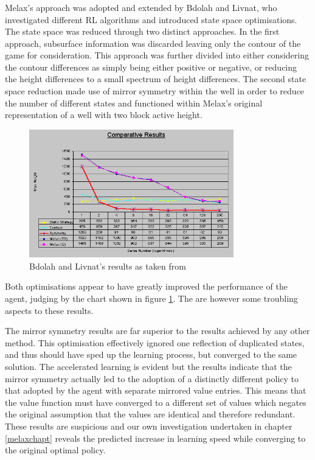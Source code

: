 \documentclass{rucsthesis}
\begin{document}
\subsubsection{\cite{yaeltetris}}

Melax's approach was adopted and extended by Bdolah and Livnat, who investigated different RL algorithms and introduced state space optimisations. The state space was reduced through two distinct approaches. In the first approach, subsurface information was discarded leaving only the contour of the game for consideration. This approach was further divided into either considering the contour differences as simply being either positive or negative, or reducing the height differences to a small spectrum of height differences. The second state space reduction made use of mirror symmetry within the well in order to reduce the number of different states and functioned within Melax's original representation of a well with two block active height.

\begin{figure}[h]
\centering
\includegraphics[width=3.5in]{results.png}
\caption{Bdolah and Livnat's results as taken from \cite{yaeltetris}}
\label{fig:yaelres}
\end{figure}

Both optimisations appear to have greatly improved the performance of the agent, judging by the chart shown in figure \ref{fig:yaelres}. The are however some troubling aspects to these results.

The mirror symmetry results are far superior to the results achieved by any other method. This optimisation effectively ignored one reflection of duplicated states, and thus should have sped up the learning process, but converged to the same solution. The accelerated learning is evident but the results indicate that the mirror symmetry actually led to the adoption of a distinctly different policy to that adopted by the agent with separate mirrored value entries. This means that the value function must have converged to a different set of values which negates the original assumption that the values are identical and therefore redundant. These results are suspicious and our own investigation undertaken in chapter \ref{melaxchapt} reveals the predicted increase in learning speed while converging to the original optimal policy.
\end{document}

